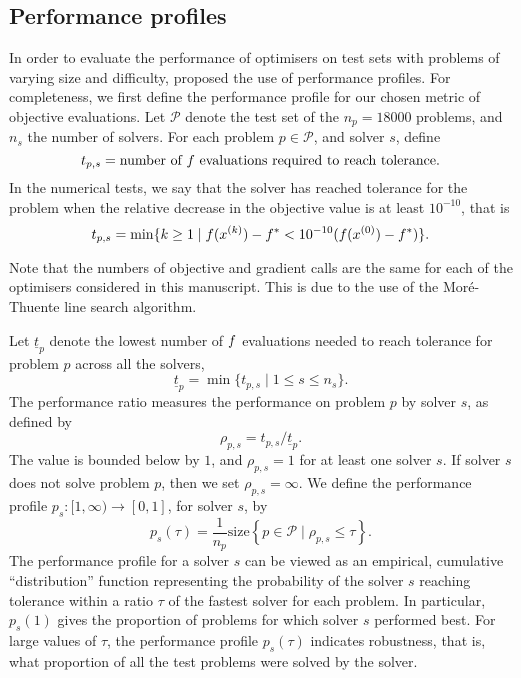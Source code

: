 \documentclass[main.tex]{subfiles}
\begin{document}
\subsection{Performance profiles}\label{subsec:perf_prof}
In order to evaluate the performance of optimisers on test sets with
problems of varying size and difficulty, \citet{dolan2002benchmarking}
proposed the use of performance profiles.  For completeness, we first
define the performance profile for our chosen metric of objective
evaluations.  Let $\mathcal{P}$ denote the test set of the
$n_p=\num{18000}$ problems, and $n_s$ the number of solvers.  For each
problem $p\in\mathcal{P}$, and solver $s$, define
\begin{equation}
  t_{p,s} = \text{number of $f$ evaluations required to reach
    tolerance.}
\end{equation}
In the numerical tests, we say that the solver has reached tolerance
for the problem when the relative decrease in the objective value is
at least $10^{-10}$, that is
\begin{equation}\label{eq:def_performance_measure}
  t_{p,s} = \min\{k\geq 1 \mid f(x^{(k)})-f^* < 10^{-10}(f(x^{(0)})-f^*)\}.
\end{equation}
\begin{remark}
  Note that the numbers of objective and gradient calls are the same
  for each of the optimisers considered in this manuscript. This is
  due to the use of the Mor\'{e}-Thuente line search algorithm.
\end{remark}

Let $\underline{t}_p$ denote the lowest number of $f$ evaluations
needed to reach tolerance for problem $p$ across all the solvers,
\begin{equation}
  \underline{t}_p=\min\{t_{p,s}\mid 1\leq s\leq n_s\}.
\end{equation}
The performance ratio measures the performance on problem $p$ by
solver $s$, as defined by
\begin{equation}
  \rho_{p,s}=t_{p,s}/\underline{t}_p.
\end{equation}
The value is bounded below by $1$, and $\rho_{p,s}=1$ for at least one
solver $s$.  If solver $s$ does not solve problem $p$, then we set
$\rho_{p,s}=\infty$.  We define the performance profile
$p_s:[1,\infty)\to[0,1]$, for solver $s$, by
\begin{equation}\label{eq:perf_profile}
  p_s(\tau) = \frac{1}{n_p}\mbox{size}\left\{p\in\mathcal{P}\mid \rho_{p,s}\leq \tau\right\}.
\end{equation}
The performance profile for a solver $s$ can be viewed as an
empirical, cumulative ``distribution'' function representing the
probability of the solver $s$ reaching tolerance within a ratio $\tau$
of the fastest solver for each problem.  In particular, $p_s(1)$ gives
the proportion of problems for which solver $s$ performed best. For
large values of $\tau$, the performance profile $p_s(\tau)$ indicates
robustness, that is, what proportion of all the test problems were
solved by the solver.
\end{document}
